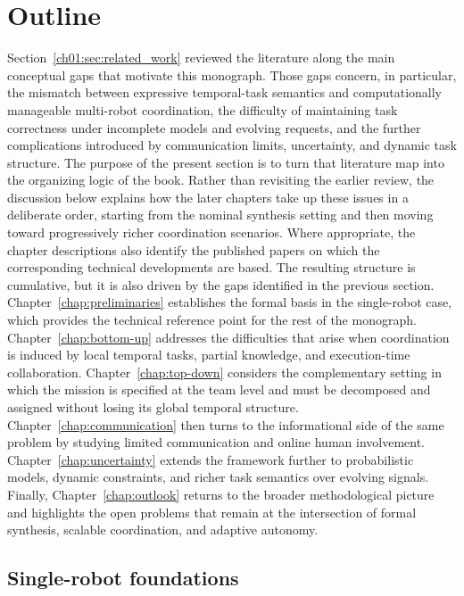 \section{Outline}
\label{sec:ch01:outline}

Section~\ref{ch01:sec:related_work} reviewed the literature along the main
conceptual gaps that motivate this monograph. Those gaps concern, in
particular, the mismatch between expressive temporal-task semantics and
computationally manageable multi-robot coordination, the difficulty of
maintaining task correctness under incomplete models and evolving requests, and
the further complications introduced by communication limits, uncertainty, and
dynamic task structure. The purpose of the present section is to turn that
literature map into the organizing logic of the book. Rather than revisiting
the earlier review, the discussion below explains how the later chapters take
up these issues in a deliberate order, starting from the nominal synthesis
setting and then moving toward progressively richer coordination scenarios.
Where appropriate, the chapter descriptions also identify the published papers
on which the corresponding technical developments are based.
The resulting structure is cumulative, but it is also driven by the gaps
identified in the previous section. Chapter~\ref{chap:preliminaries}
establishes the formal basis in the single-robot case, which provides the
technical reference point for the rest of the monograph. Chapter~\ref{chap:bottom-up}
addresses the difficulties that arise when coordination is induced by local
temporal tasks, partial knowledge, and execution-time collaboration.
Chapter~\ref{chap:top-down} considers the complementary setting in which the
mission is specified at the team level and must be decomposed and assigned
without losing its global temporal structure. Chapter~\ref{chap:communication}
then turns to the informational side of the same problem by studying limited
communication and online human involvement. Chapter~\ref{chap:uncertainty}
extends the framework further to probabilistic models, dynamic constraints, and
richer task semantics over evolving signals. Finally,
Chapter~\ref{chap:outlook} returns to the broader methodological picture and
highlights the open problems that remain at the intersection of formal
synthesis, scalable coordination, and adaptive autonomy.



\subsection{Single-robot foundations}
\label{sec:ch01:outline:foundations}

